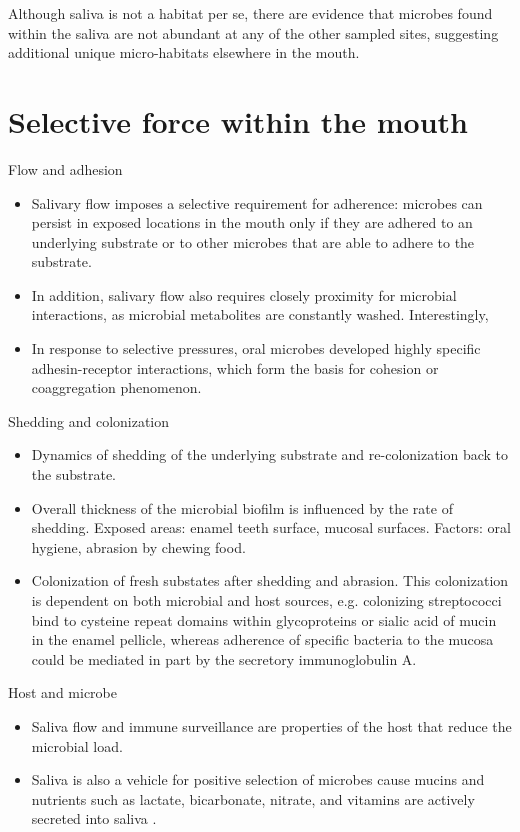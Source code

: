 Although saliva is not a habitat per se, there are evidence that microbes found within the saliva are not abundant at 
any of the other sampled sites, suggesting additional unique micro-habitats elsewhere in the mouth. 

\section{Selective force within the mouth}
Flow and adhesion
\begin{itemize}
    \item Salivary flow imposes a selective requirement for adherence: microbes can persist in exposed locations in the 
    mouth only if they are adhered to an underlying substrate or to other microbes that are able to adhere to the substrate. 
    \item In addition, salivary flow also requires closely proximity for microbial interactions, as microbial metabolites 
    are constantly washed. Interestingly,  
    \item In response to selective pressures, oral microbes developed highly specific adhesin-receptor interactions, 
    which form the basis for cohesion or coaggregation phenomenon. 
\end{itemize}
Shedding and colonization
\begin{itemize}
    \item Dynamics of shedding of the underlying substrate and re-colonization back to the substrate.
    \item Overall thickness of the microbial biofilm is influenced by the rate of shedding. Exposed areas: enamel teeth 
    surface, mucosal surfaces. Factors: oral hygiene, abrasion by chewing food. 
    \item Colonization of fresh substates after shedding and abrasion. This colonization is dependent on both microbial 
    and host sources, e.g. colonizing streptococci bind to cysteine repeat domains within glycoproteins or sialic acid of 
    mucin in the enamel pellicle, whereas adherence of specific bacteria to the mucosa could be mediated in part by the secretory 
    immunoglobulin A.
\end{itemize}
Host and microbe
\begin{itemize}
    \item Saliva flow and immune surveillance are properties of the host that reduce the microbial load. 
    \item Saliva is also a vehicle for positive selection of microbes cause mucins and nutrients such as lactate, 
    bicarbonate, nitrate, and vitamins are actively secreted into saliva \cite{Carpenter2020}.
\end{itemize}

